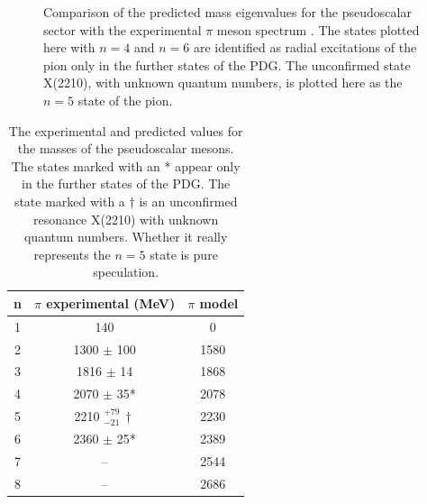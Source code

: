 \begin{figure}[htb]
\caption{Comparison of the predicted mass eigenvalues for the pseudoscalar sector with the experimental $\pi$ meson spectrum \cite{PDG}.
  The states plotted here with $n=4$ and $n=6$ are identified as radial excitations of the pion only in the further states of the PDG.  
  The unconfirmed state X(2210), with unknown quantum numbers, is plotted here as the $n=5$ state of the pion.}
\label{figPion}
\end{figure}

\begin{table}[htb]
\center
\begin{tabular}{| c || c | c  |}
\hline
n & $\pi$ experimental (MeV) & $\pi$ model \\
\hline
1 & 140 &				0 \\
2 & 1300 $\pm$ 100 & 	1580 \\
3 & 1816 $\pm$ 14&		1868 \\
4 & 2070 $\pm$ 35* & 	2078 \\ 
5 & 2210 $^{+79}_{-21} \, \dagger $ &	2230	\\
6 & 2360 $\pm$ 25* & 				2389 \\
7 & -- & 				2544 \\
8 & -- &				2686 \\
\hline
\end{tabular}
\caption{The experimental \cite{PDG} and predicted values for the masses of the pseudoscalar mesons.  
The states marked with an * appear only in the further states of the PDG.  
The state marked with a $\dagger$ is an unconfirmed resonance X(2210) with unknown quantum numbers.  Whether it really represents the $n=5$ state is pure speculation.}
\label{tabPion}
\end{table}

